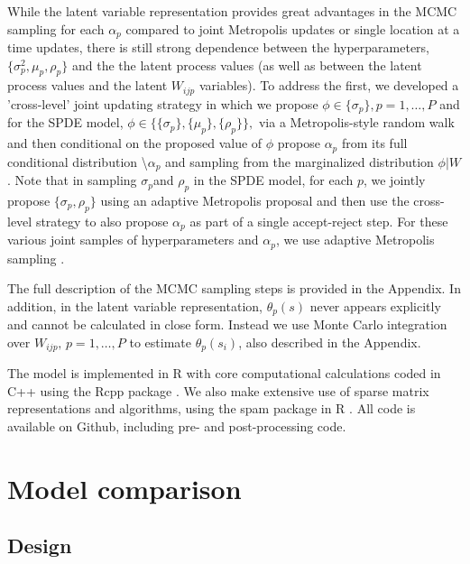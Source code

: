 \documentclass[12pt]{article}\usepackage[]{graphicx}\usepackage[]{color}
\begin{document}
While the latent variable representation provides great advantages
in the MCMC sampling for each $\alpha_{p}$ compared to joint Metropolis
updates or single location at a time updates, there is still strong
dependence between the hyperparameters, $\{\sigma_{p}^{2},\mu_{p},\rho_{p}\}$
and the the latent process values (as well as between the latent process
values and the latent $W_{ijp}$ variables). To address the first,
we developed a 'cross-level' joint updating strategy in which we propose
$\phi\in\{\sigma_{p}\},p=1,\ldots,P$ and for the SPDE model, $\phi\in\{\{\sigma_{p}\},\{\mu_{p}\},\{\rho_{p}\}\},$
via a Metropolis-style random walk and then conditional on the proposed
value of $\phi$ propose $\alpha_{p}$ from its full conditional distribution
\textbackslash{}$\alpha_{p}$ and sampling from the marginalized distribution
$\phi|W$. Note that in sampling $\sigma_{p}$and $\rho_{p}$ in the
SPDE model, for each $p$, we jointly propose $\{\sigma_{p},\rho_{p}\}$
using an adaptive Metropolis proposal and then use the cross-level
strategy to also propose $\alpha_{p}$ as part of a single accept-reject
step. For these various joint samples of hyperparameters and $\alpha_{p}$,
we use adaptive Metropolis sampling \citep{Shab:Well:2011}.

The full description of the MCMC sampling steps is provided in the
Appendix. In addition, in the latent variable representation, $\theta_{p}(s)$
never appears explicitly and cannot be calculated in close form. Instead
we use Monte Carlo integration over $W_{ijp},\, p=1,\ldots,P$ to
estimate $\theta_{p}(s_{i})$, also described in the Appendix. 

The model is implemented in R with core computational calculations
coded in C++ using the Rcpp package \citep{Edde:Fran:2011}. We also
make extensive use of sparse matrix representations and algorithms,
using the spam package in R \citep{Furr:Sain:2010}. All code is available
on Github, including pre- and post-processing code. 


\section{Model comparison}


\subsection{Design}
\end{document}
